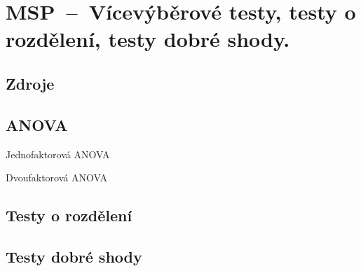 

\graphicspath{{msp/testy/figures}}


\chapter{MSP~--~Vícevýběrové testy, testy o rozdělení, testy dobré shody.}


\section{Zdroje}

\begin{compactitem}
    \item {}
\end{compactitem}


\section{ANOVA}


Jednofaktorová ANOVA

Dvoufaktorová ANOVA


\section{Testy o rozdělení}



\section{Testy dobré shody}

